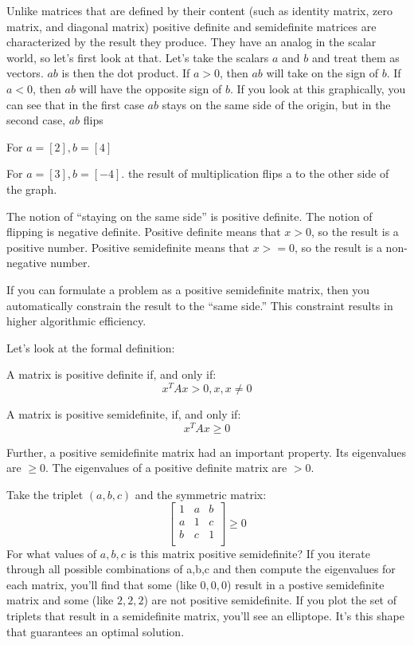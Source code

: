 Unlike matrices that are defined by their content (such as identity matrix, zero matrix, and diagonal matrix) positive definite and semidefinite matrices are characterized by the result they produce. They have an analog in the scalar world, so let's first look at that. Let's take the scalars $a$ and $b$ and treat them as vectors. $ab$ is then the dot product. If $a >0$, then $ab$ will take on the sign of $b$. If $a < 0$, then $ab$ will have the opposite sign of $b$. If you look at this graphically, you can see that in the first case $ab$ stays on the same side of the origin, but in the second case, $ab$ flips

For $a = [2], b = [4]$ 


For $a = [3], b = [-4]$. the result of multiplication flips a to the other side of the graph. 


The notion of “staying on the same side” is positive definite. The notion of flipping is negative definite. Positive definite means that $x > 0$, so the result is a positive number. Positive semidefinite means that $x >= 0$, so the result is a non-negative number. 

If you can formulate a problem as a positive semidefinite matrix, then you automatically constrain the result to the “same side.”  This constraint results in higher algorithmic efficiency.

Let's look at the formal definition:

A matrix is positive definite if, and only if:
$$x^{T}Ax > 0, x,  x \neq 0$$

A matrix is positive semidefinite, if, and only if:
$$x^{T}Ax \geq 0$$

Further, a positive semidefinite matrix had an important property. Its eigenvalues are $\geq 0$. The eigenvalues of a positive definite matrix  are $> 0$.

Take the triplet $(a, b, c)$ and the symmetric matrix:
$$
\begin{bmatrix}
 1  & a & b  \\
 a  & 1 & c  \\
 b  & c & 1  \\
\end{bmatrix}
\geq 0
$$
For what values of $a, b, c$ is this matrix positive semidefinite? If you iterate through all possible combinations of a,b,c and then compute the eigenvalues for each matrix, you'll find that some (like $0,0,0$) result in a postive semidefinite matrix and some (like $2, 2, 2 $) are not positive semidefinite. If you plot the set of triplets that result in a semidefinite matrix, you'll see an elliptope. It's this shape that guarantees an optimal solution.

